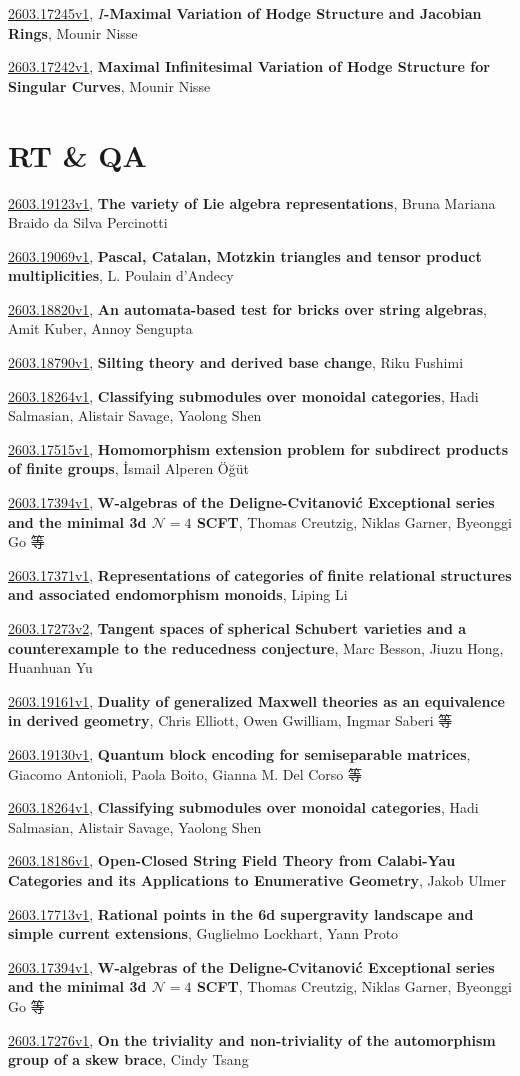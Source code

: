 \documentclass[9pt, a4paper]{article}
\theoremstyle{plain}
\theoremstyle{definition}
\theoremstyle{remark}
\newcommand{\arxiv}[3]{\href{https://arxiv.org/abs/#1}{#1}, \textbf{\textcolor{arxivblue}{#2}}, #3}
\begin{document}
\arxiv{2603.17245v1}{$I$-Maximal Variation of Hodge Structure and Jacobian Rings}{Mounir Nisse}

\arxiv{2603.17242v1}{Maximal Infinitesimal Variation of Hodge Structure for Singular Curves}{Mounir Nisse}


\section{RT \& QA}
\arxiv{2603.19123v1}{The variety of Lie algebra representations}{Bruna Mariana Braido da Silva Percinotti}

\arxiv{2603.19069v1}{Pascal, Catalan, Motzkin triangles and tensor product multiplicities}{L. Poulain d'Andecy}

\arxiv{2603.18820v1}{An automata-based test for bricks over string algebras}{Amit Kuber, Annoy Sengupta}

\arxiv{2603.18790v1}{Silting theory and derived base change}{Riku Fushimi}

\arxiv{2603.18264v1}{Classifying submodules over monoidal categories}{Hadi Salmasian, Alistair Savage, Yaolong Shen}

\arxiv{2603.17515v1}{Homomorphism extension problem for subdirect products of finite groups}{İsmail Alperen Öğüt}

\arxiv{2603.17394v1}{W-algebras of the Deligne-Cvitanović Exceptional series and the minimal 3d ${\mathcal N}=4$ SCFT}{Thomas Creutzig, Niklas Garner, Byeonggi Go 等}

\arxiv{2603.17371v1}{Representations of categories of finite relational structures and associated endomorphism monoids}{Liping Li}

\arxiv{2603.17273v2}{Tangent spaces of spherical Schubert varieties and a counterexample to the reducedness conjecture}{Marc Besson, Jiuzu Hong, Huanhuan Yu}

\arxiv{2603.19161v1}{Duality of generalized Maxwell theories as an equivalence in derived geometry}{Chris Elliott, Owen Gwilliam, Ingmar Saberi 等}

\arxiv{2603.19130v1}{Quantum block encoding for semiseparable matrices}{Giacomo Antonioli, Paola Boito, Gianna M. Del Corso 等}

\arxiv{2603.18264v1}{Classifying submodules over monoidal categories}{Hadi Salmasian, Alistair Savage, Yaolong Shen}

\arxiv{2603.18186v1}{Open-Closed String Field Theory from Calabi-Yau Categories and its Applications to Enumerative Geometry}{Jakob Ulmer}

\arxiv{2603.17713v1}{Rational points in the 6d supergravity landscape and simple current extensions}{Guglielmo Lockhart, Yann Proto}

\arxiv{2603.17394v1}{W-algebras of the Deligne-Cvitanović Exceptional series and the minimal 3d ${\mathcal N}=4$ SCFT}{Thomas Creutzig, Niklas Garner, Byeonggi Go 等}

\arxiv{2603.17276v1}{On the triviality and non-triviality of the automorphism group of a skew brace}{Cindy Tsang}

\end{document}
